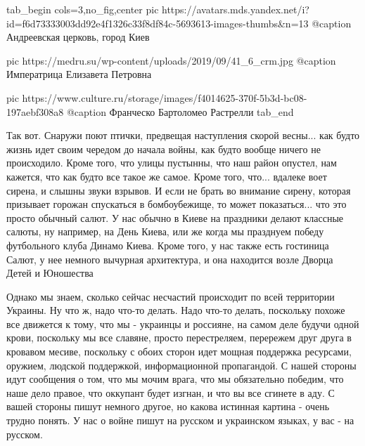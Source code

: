\ifcmt
  tab_begin cols=3,no_fig,center
     pic https://avatars.mds.yandex.net/i?id=f6d73333003dd92e4f1326c33f8df84c-5693613-images-thumbs&n=13
		 @caption Андреевская церковь, город Киев

		 pic https://medru.su/wp-content/uploads/2019/09/41_6_crm.jpg
		 @caption Императрица Елизавета Петровна

		 pic https://www.culture.ru/storage/images/f4014625-370f-5b3d-bc08-197aebf308a8
		 @caption Франческо Бартоломео Растрелли
  tab_end
\fi

Так вот. Снаружи поют птички, предвещая наступления скорой весны... как будто
жизнь идет своим чередом до начала войны, как будто вообще ничего не
происходило. Кроме того, что улицы пустынны, что наш район опустел, нам
кажется, что как будто все такое же самое. Кроме того, что... вдалеке воет
сирена, и слышны звуки взрывов.  И если не брать во внимание сирену, которая
призывает горожан спускаться в бомбоубежище, то может показаться... что это
просто обычный салют. У нас обычно в Киеве на праздники делают классные салюты, ну например, на
День Киева, или же когда мы празднуем победу футбольного клуба Динамо Киева. Кроме того,
у нас также есть гостиница Салют, у нее немного вычурная архитектура, и она находится возле
Дворца Детей и Юношества 

Однако мы знаем, сколько сейчас несчастий происходит по всей территории
Украины. Ну что ж, надо что-то делать. Надо что-то делать, поскольку похоже все
движется к тому, что мы - украинцы и россияне, на самом деле будучи одной
крови, поскольку мы все славяне, просто перестреляем, перережем друг друга в
кровавом месиве, поскольку с обоих сторон идет мощная поддержка ресурсами,
оружием, людской поддержкой, информационной пропагандой. С нашей стороны идут
сообщения о том, что мы мочим врага, что мы обязательно победим, что наше дело
правое, что оккупант будет изгнан, и что вы все сгинете в аду. С вашей стороны
пишут немного другое, но какова истинная картина - очень трудно понять.  У нас
о войне пишут на русском и украинском языках, у вас - на русском.

